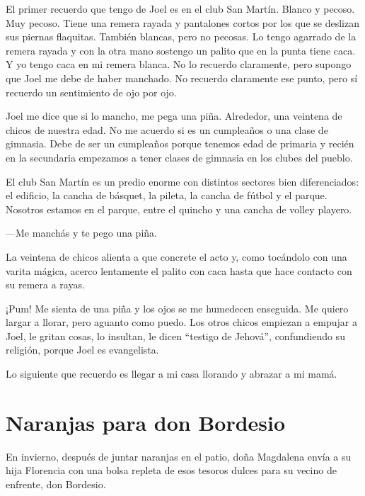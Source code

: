 \documentclass[11pt,twoside,openright]{book}
\begin{document}
El primer recuerdo que tengo de Joel es en el club San Martín. Blanco y pecoso. Muy pecoso. Tiene una remera rayada y pantalones cortos por los que se deslizan sus piernas flaquitas. También blancas, pero no pecosas. Lo tengo agarrado de la remera rayada y con la otra mano sostengo un palito que en la punta tiene caca. Y yo tengo caca en mi remera blanca. No lo recuerdo claramente, pero supongo que Joel me debe de haber manchado. No recuerdo claramente ese punto, pero sí recuerdo un sentimiento de ojo por ojo.

Joel me dice que si lo mancho, me pega una piña. Alrededor, una veintena de chicos de nuestra edad. No me acuerdo si es un cumpleaños o una clase de gimnasia. Debe de ser un cumpleaños porque tenemos edad de primaria y recién en la secundaria empezamos a tener clases de gimnasia en los clubes del pueblo.

El club San Martín es un predio enorme con distintos sectores bien diferenciados: el edificio, la cancha de básquet, la pileta, la cancha de fútbol y el parque. Nosotros estamos en el parque, entre el quincho y una cancha de volley playero.

—Me manchás y te pego una piña.

La veintena de chicos alienta a que concrete el acto y, como tocándolo con una varita mágica, acerco lentamente el palito con caca hasta que hace contacto con su remera a rayas.

¡Pum! Me sienta de una piña y los ojos se me humedecen enseguida. Me quiero largar a llorar, pero aguanto como puedo. Los otros chicos empiezan a empujar a Joel, le gritan cosas, lo insultan, le dicen “testigo de Jehová”, confundiendo su religión, porque Joel es evangelista.

Lo siguiente que recuerdo es llegar a mi casa llorando y abrazar a mi mamá.





\chapter*{Naranjas para don Bordesio} 





En invierno, después de juntar naranjas en el patio, doña Magdalena envía a su hija Florencia con una bolsa repleta de esos tesoros dulces para su vecino de enfrente, don Bordesio.
\end{document}
